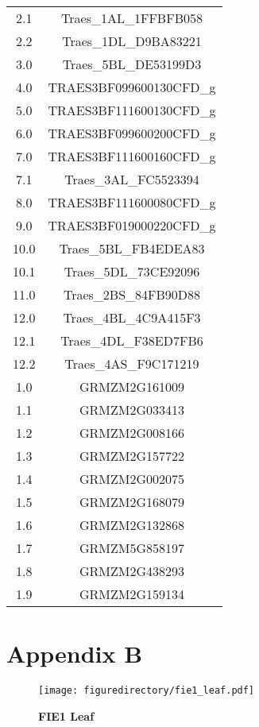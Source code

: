\documentclass[12pt,]{book}
\begin{document}
\begin{table}[htp]
\begin{center}
\begin{tabular}{cc}
2.1  & Traes\_1AL\_1FFBFB058    \\
2.2  & Traes\_1DL\_D9BA83221    \\
3.0  & Traes\_5BL\_DE53199D3    \\
4.0  & TRAES3BF099600130CFD\_g \\
5.0  & TRAES3BF111600130CFD\_g \\
6.0  & TRAES3BF099600200CFD\_g \\
7.0  & TRAES3BF111600160CFD\_g \\
7.1  & Traes\_3AL\_FC5523394    \\
8.0  & TRAES3BF111600080CFD\_g \\
9.0  & TRAES3BF019000220CFD\_g \\
10.0 & Traes\_5BL\_FB4EDEA83    \\
10.1 & Traes\_5DL\_73CE92096    \\
11.0 & Traes\_2BS\_84FB90D88    \\
12.0 & Traes\_4BL\_4C9A415F3    \\
12.1 & Traes\_4DL\_F38ED7FB6    \\
12.2 & Traes\_4AS\_F9C171219    \\
1.0  & GRMZM2G161009          \\
1.1  & GRMZM2G033413          \\
1.2  & GRMZM2G008166          \\
1.3  & GRMZM2G157722          \\
1.4  & GRMZM2G002075          \\
1.5  & GRMZM2G168079          \\
1.6  & GRMZM2G132868          \\
1.7  & GRMZM5G858197          \\
1.8  & GRMZM2G438293          \\
1.9  & GRMZM2G159134          \\
\bottomrule
\end{tabular}
\end{center}
\end{table}

\chapter*{Appendix B}\label{chapter:appendixb}

\begin{figure}[htbp]
\centering
\texttt{[image: figuredirectory/fie1\_leaf.pdf]}
\caption{\textbf{FIE1 Leaf}}\label{figure:3xx:fie1msi1leaf}
\end{figure}
\end{document}
